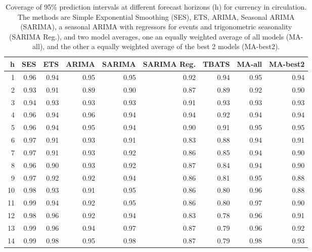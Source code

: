\documentclass{article}
\begin{document}
\begin{table}[!h]
    \centering
\begin{tabular}{rrrrrrrrr}
  \hline
h & SES & ETS & ARIMA & SARIMA & SARIMA Reg. & TBATS & MA-all & MA-best2 \\ 
  \hline
1 & 0.96 & 0.94 & 0.95 & 0.95 & 0.92 & 0.94 & 0.95 & 0.94 \\ 
  2 & 0.93 & 0.91 & 0.89 & 0.90 & 0.87 & 0.89 & 0.92 & 0.90 \\ 
  3 & 0.94 & 0.93 & 0.93 & 0.93 & 0.91 & 0.93 & 0.93 & 0.93 \\ 
  4 & 0.96 & 0.94 & 0.96 & 0.94 & 0.94 & 0.92 & 0.94 & 0.94 \\ 
  5 & 0.96 & 0.94 & 0.95 & 0.94 & 0.90 & 0.91 & 0.95 & 0.95 \\ 
  6 & 0.97 & 0.91 & 0.93 & 0.91 & 0.83 & 0.88 & 0.94 & 0.91 \\ 
  7 & 0.97 & 0.91 & 0.93 & 0.92 & 0.86 & 0.85 & 0.94 & 0.90 \\ 
  8 & 0.96 & 0.90 & 0.93 & 0.92 & 0.87 & 0.84 & 0.94 & 0.90 \\ 
  9 & 0.97 & 0.92 & 0.92 & 0.94 & 0.86 & 0.81 & 0.95 & 0.88 \\ 
  10 & 0.98 & 0.93 & 0.91 & 0.95 & 0.86 & 0.80 & 0.96 & 0.88 \\ 
  11 & 0.99 & 0.94 & 0.92 & 0.95 & 0.86 & 0.80 & 0.97 & 0.90 \\ 
  12 & 0.98 & 0.96 & 0.92 & 0.94 & 0.83 & 0.78 & 0.96 & 0.91 \\ 
  13 & 0.99 & 0.96 & 0.94 & 0.97 & 0.87 & 0.79 & 0.96 & 0.92 \\ 
  14 & 0.99 & 0.98 & 0.95 & 0.98 & 0.87 & 0.79 & 0.98 & 0.93 \\ 
   \hline
\end{tabular}
\caption{Coverage of 95\% prediction intervals at different forecast horizons (h) for currency in circulation. The methods are Simple Exponential Smoothing (SES), ETS, ARIMA, Seasonal ARIMA (SARIMA), a seasonal ARIMA with regressors for events and trigonometric seasonality (SARIMA Reg.), and two model averages, one an equally weighted average of all models (MA-all), and the other a equally weighted average of the best 2 models (MA-best2).} 
\label{tab:covcic}
\end{table}
\end{document}
